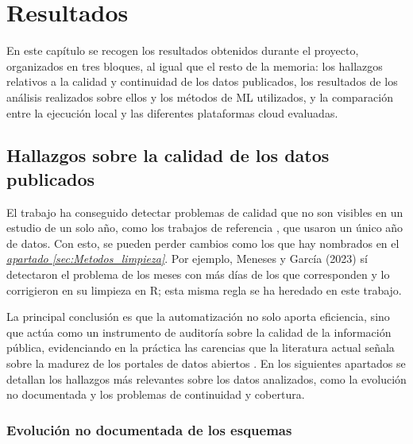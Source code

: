 \chapter{Resultados}
\label{cap:Resultados}


En este capítulo se recogen los resultados obtenidos durante el proyecto, organizados en tres bloques, al igual que el resto de la memoria: los hallazgos relativos a la calidad y continuidad de los datos publicados, los resultados de los análisis realizados sobre ellos y los métodos de ML utilizados, y la comparación entre la ejecución local y las diferentes plataformas cloud evaluadas.

\section{Hallazgos sobre la calidad de los datos publicados}
\label{sec:Resultados_datos}

El trabajo ha conseguido detectar problemas de calidad que no son visibles en un estudio de un solo año, como los trabajos de referencia \citep{Meneses2023Madrid, SaizSantos2023}, que usaron un único año de datos. Con esto, se pueden perder cambios como los que hay nombrados en el \hyperref[sec:Metodos_limpieza]{\textit{apartado \ref*{sec:Metodos_limpieza}}}. Por ejemplo, Meneses y García (2023) sí detectaron el problema de los meses con más días de los que corresponden y lo corrigieron en su limpieza en R; esta misma regla se ha heredado en este trabajo.

La principal conclusión es que la automatización no solo aporta eficiencia, sino que actúa como un instrumento de auditoría sobre la calidad de la información pública, evidenciando en la práctica las carencias que la literatura actual señala sobre la madurez de los portales de datos abiertos \citep{verhulst2020, OECD2023openData, MelendrezMoreto2016Auditoria}. En los siguientes apartados se detallan los hallazgos más relevantes sobre los datos analizados, como la evolución no documentada y los problemas de continuidad y cobertura.

\subsection{Evolución no documentada de los esquemas}
\label{sec:Resultados_drift}

